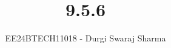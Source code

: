\documentclass[journal]{IEEEtran}
\begin{document}

\vspace{3cm}

\title{9.5.6}
\author{EE24BTECH11018 - Durgi Swaraj Sharma}

{\let\newpage\relax\maketitle}

\renewcommand{\thefigure}{\theenumi}
\renewcommand{\thetable}{\theenumi}
\setlength{\intextsep}{10pt} %


\renewcommand{\thetable}{\theenumi}
\end{document}
